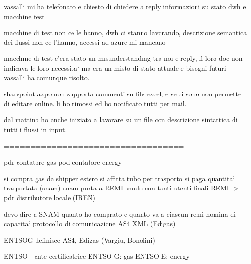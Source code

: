 vassalli mi ha telefonato e chiesto di chiedere a reply informazioni su stato dwh e macchine test

macchine di test non ce le hanno, dwh ci stanno lavorando, descrizione semantica dei flussi non ce l'hanno, accessi ad azure mi mancano

macchine di test c'era stato un misunderstanding tra noi e reply, il loro doc non indicava le loro necessita` ma era un misto di stato attuale e bisogni futuri
vassalli ha comunque risolto.


sharepoint axpo non supporta commenti su file excel, e se ci sono non permette di editare online.
li ho rimossi ed ho notificato tutti per mail.

dal mattino ho anche iniziato a lavorare su un file con descrizione sintattica di tutti i flussi in input.


==================================

pdr contatore gas
pod contatore energy


si compra gas da shipper estero
si affitta tubo per trasporto
    si paga quantita` trasportata
    (snam)
snam porta a REMI
    snodo con tanti utenti finali
REMI -> pdr
    distributore locale
    (IREN)
    
devo dire a SNAM quanto ho comprato e quanto va a ciascun remi
    nomina di capacita`
    protocollo di comunicazione AS4
        XML (Edigas)
        
    ENTSOG definisce AS4, Edigas
    (Vargiu, Bonolini)


ENTSO - ente certificatrice
    ENTSO-G: gas
    ENTSO-E: energy